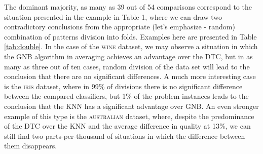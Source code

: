 \documentclass[12pt,a4paper]{report}
\begin{document}
The dominant majority, as many as 39 out of 54 comparisons correspond to the situation presented in the example in Table 1, where we can draw two contradictory conclusions from the appropriate (let's emphasize - random) combination of patterns division into folds. Examples here are presented in Table \ref{tab:double}. In the case of the \textsc{wine} dataset, we may observe a situation in which the GNB algorithm in averaging achieves an advantage over the DTC, but in as many as three out of ten cases, random division of the data set will lead to the conclusion that there are no significant differences. A much more interesting case is the \textsc{iris} dataset, where in 99\% of divisions there is no significant difference between the compared classifiers, but 1\% of the problem instances leads to the conclusion that the KNN has a significant advantage over GNB. An even stronger example of this type is the \textsc{australian} dataset, where, despite the predominance of the DTC over the KNN and the average difference in quality at 13\%, we can still find two parts-per-thousand of situations in which the difference between them disappears.



\end{document}
